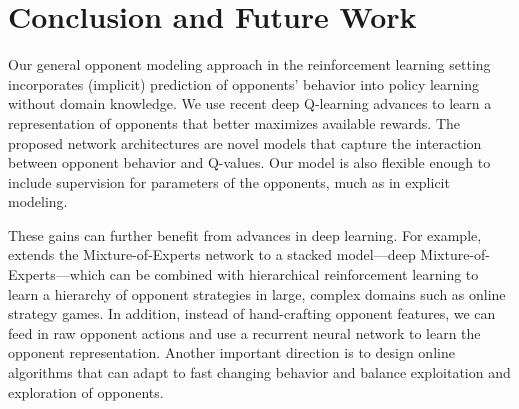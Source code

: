 \section{Conclusion and Future Work}
\label{sec:conclusion}
Our general opponent modeling approach in the reinforcement learning setting incorporates (implicit) prediction of opponents' behavior into policy learning without domain knowledge.
We use recent deep Q-learning advances
to learn a representation of opponents that better maximizes available rewards.
The proposed network architectures are novel models that capture the interaction between opponent behavior and Q-values.
Our model is also flexible enough to include supervision for parameters of the opponents, much as in explicit modeling.

These gains can further benefit from advances in deep learning.  For example, \citet{eigen13dmoe} extends the Mixture-of-Experts network to a stacked model---deep Mixture-of-Experts---which can be combined with hierarchical reinforcement learning to learn a hierarchy of opponent strategies in large, complex domains such as online strategy games.
In addition, instead of hand-crafting opponent features, we can feed in raw opponent actions and use a recurrent neural network to learn the opponent representation.
Another important direction is to design online algorithms that can adapt to fast changing behavior and balance exploitation and exploration of opponents.

